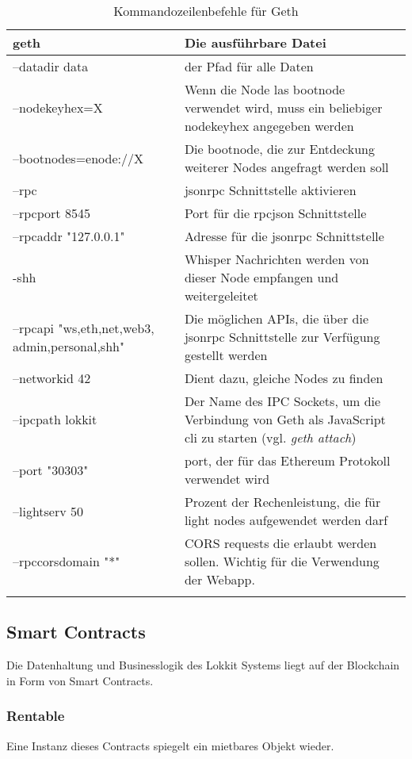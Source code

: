 \begin{table}[H]
\centering
\caption{Kommandozeilenbefehle für Geth\cite[Wiki/Management APIs]{go-ethereum}}
\label{tbl:geth cli}
\begin{tabular}{@{}L{4cm}L{10cm}@{}}
\toprule
geth & Die ausführbare Datei \\ \midrule
--datadir data & der Pfad für alle Daten \\ \midrule
--nodekeyhex=X & Wenn die Node las bootnode verwendet wird, muss ein beliebiger nodekeyhex angegeben werden \\ \midrule
--bootnodes=enode://X & Die bootnode, die zur Entdeckung weiterer Nodes angefragt werden soll \\ \midrule
--rpc & jsonrpc Schnittstelle aktivieren \\ \midrule
--rpcport 8545 & Port für die rpcjson Schnittstelle \\ \midrule
--rpcaddr "127.0.0.1" & Adresse für die jsonrpc Schnittstelle \\ \midrule
-shh & Whisper Nachrichten werden von dieser Node empfangen und weitergeleitet \\ \midrule
--rpcapi "ws,eth,net,web3, admin,personal,shh" & Die möglichen APIs, die über die jsonrpc Schnittstelle zur Verfügung gestellt werden \\ \midrule
--networkid 42 & Dient dazu, gleiche Nodes zu finden \\ \midrule
--ipcpath lokkit & Der Name des IPC Sockets, um die Verbindung von Geth als JavaScript cli zu starten (vgl. \emph{geth attach}) \\ \midrule
--port "30303" & port, der für das Ethereum Protokoll verwendet wird \\ \midrule
--lightserv 50 & Prozent der Rechenleistung, die für light nodes aufgewendet werden darf \\ \midrule
--rpccorsdomain "*" & CORS requests die erlaubt werden sollen. Wichtig für die Verwendung der Webapp. \\ \midrule
 \\ \bottomrule
\end{tabular}
\end{table}

\subsection{Smart Contracts}
Die Datenhaltung und Businesslogik des Lokkit Systems liegt auf der Blockchain in Form von Smart Contracts.
\subsubsection{Rentable}
\label{sys_subsubsec:Rentable}
Eine Instanz dieses Contracts spiegelt ein mietbares Objekt wieder.

